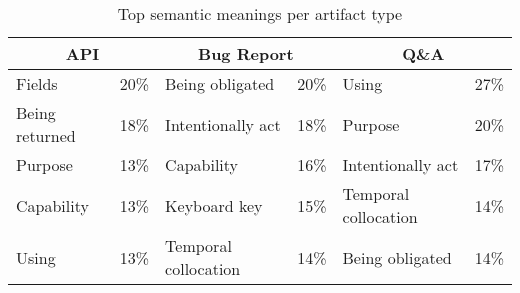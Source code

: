 
\begin{table}
\begin{center}
\caption{Top semantic meanings per artifact type}
\begin{scriptsize}
\begin{threeparttable}    
\begin{tabular}{lc|lc|lc}
\hline    
\multicolumn{2}{c|}{\textbf{API}} &
\multicolumn{2}{c|}{\textbf{Bug Report}} &
\multicolumn{2}{c}{\textbf{Q\&A}} \\     
%
\hline
\hline
% 
Fields  & 20\% &
Being  obligated  & 20\% &
\parbox[c][.4cm][c]{1.4cm}{Using} & 27\% \\
% 
\parbox[c][.7cm][c]{1.2cm}{Being  returned\tnote{\dag}} & 18\% &
\parbox[c][.4cm][c]{1.4cm}{Intentionally act} & 18\% &
Purpose & 20\% \\
% 
Purpose  &  13\% &
\parbox[c][.4cm][c]{1.4cm}{Capability} & 16\% &
Intentionally act & 17\% \\
% 
\parbox[c][.4cm][c]{1.2cm}{Capability}  & 13\% &
Keyboard  key\tnote{\dag} & 15\% &
\parbox[c][.7cm][c]{1.4cm}{Temporal  collocation} & 14\% \\
% 
Using  &  13\% &
\parbox[c][.7cm][c]{1.4cm}{Temporal  collocation} & 14\% &
Being  obligated & 14\% \\
% 

\hline
\end{tabular}
\end{threeparttable}    
\end{scriptsize}
\smallskip
\label{tbl:common-frames-artifact-type-wise}
\end{center}
\end{table}

